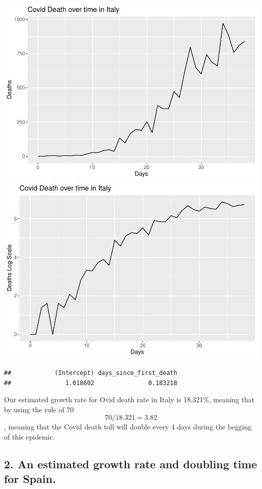 \documentclass[
]{article}
\begin{document}
\includegraphics{HW3_files/figure-latex/unnamed-chunk-6-1.pdf}
\includegraphics{HW3_files/figure-latex/unnamed-chunk-6-2.pdf}

\begin{verbatim}
##            (Intercept) days_since_first_death 
##               1.018602               0.183218
\end{verbatim}

Our estimated growth rate for Ovid death rate in Italy is 18.321\%,
meaning that by using the rule of 70 \[ 70/18.321 = 3.82\], meaning that
the Covid death toll will double every 4 days during the begging of this
epidemic.

\hypertarget{an-estimated-growth-rate-and-doubling-time-for-spain.}{%
\subsection{2. An estimated growth rate and doubling time for
Spain.}\label{an-estimated-growth-rate-and-doubling-time-for-spain.}}
\end{document}
